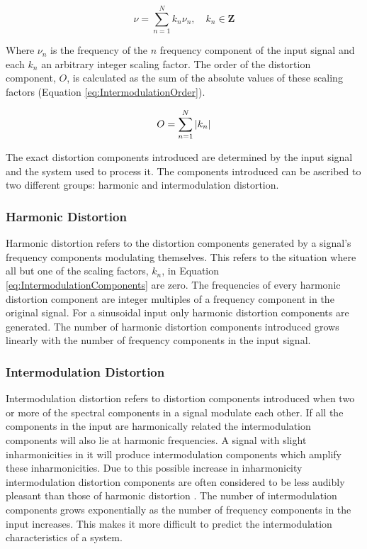 		\begin{equation}
			\nu = \sum_{n = 1}^{N} k_{n}\nu_{n}, \quad k_{n} \in \mathbf{Z}
			\label{eq:IntermodulationComponents}
		\end{equation}

		Where $\nu_{n}$ is the frequency of the $n$ frequency component of the input signal and each
		$k_{n}$ an arbitrary integer scaling factor. The order of the distortion component, $O$, is calculated as
		the sum of the absolute values of these scaling factors (Equation \ref{eq:IntermodulationOrder}).

		\begin{equation}
			O = \sum_{n = 1}^{N} \left|k_{n}\right|
			\label{eq:IntermodulationOrder}
		\end{equation}

		The exact distortion components introduced are determined by the input signal and the system used to process
		it. The components introduced can be ascribed to two different groups: harmonic and intermodulation
		distortion.

		\subsubsection*{Harmonic Distortion}
			Harmonic distortion refers to the distortion components generated by a signal's frequency components
			modulating themselves. This refers to the situation where all but one of the scaling factors,
			$k_{n}$, in Equation \ref{eq:IntermodulationComponents} are zero. The frequencies of every harmonic
			distortion component are integer multiples of a frequency component in the original signal. For a
			sinusoidal input only harmonic distortion components are generated. The number of harmonic
			distortion components introduced grows linearly with the number of frequency components in the input
			signal.

		\subsubsection*{Intermodulation Distortion}
			Intermodulation distortion refers to distortion components introduced when two or more of the
			spectral components in a signal modulate each other. If all the components in the input are
			harmonically related the intermodulation components will also lie at harmonic frequencies. A signal
			with slight inharmonicities in it will produce intermodulation components which amplify these
			inharmonicities. Due to this possible increase in inharmonicity intermodulation distortion
			components are often considered to be less audibly pleasant than those of harmonic distortion
			\citep{rumsey2009sound}. The number of intermodulation components grows exponentially as the number
			of frequency components in the input increases. This makes it more difficult to predict the
			intermodulation characteristics of a system.

